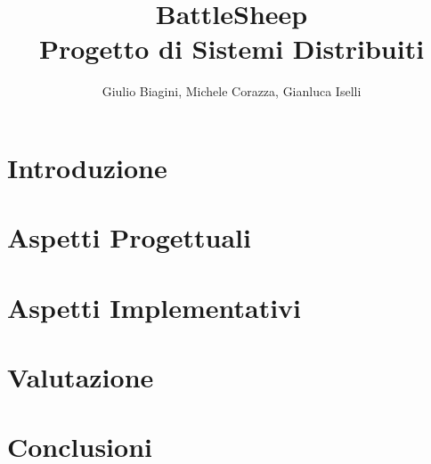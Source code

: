 \documentclass[a4paper,10pt]{article}
\begin{document}
\title{BattleSheep \\ Progetto di Sistemi Distribuiti}
\author{Giulio Biagini, Michele Corazza, Gianluca Iselli}

\maketitle

\begin{abstract}

\end{abstract}

\section{Introduzione}


\section{Aspetti Progettuali}


\section{Aspetti Implementativi}





\section{Valutazione}


\section{Conclusioni}

\end{document}
